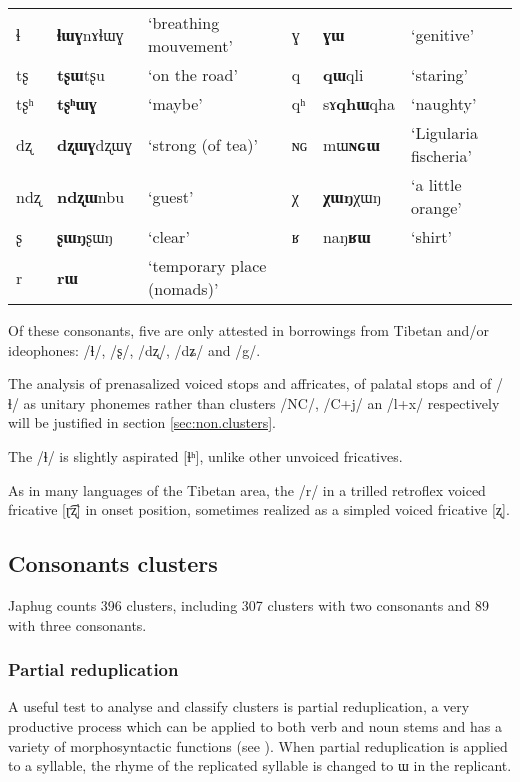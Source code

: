 \documentclass[oldfontcommands,oneside,a4paper,11pt]{article}
\newcommand{\ipa}[1]{{\phon #1}} %
\begin{document}
\begin{table}
{\begin{tabular}{lll|lll}
ɬ   & 	  \ipa{\textbf{ɬɯɣ}nɤɬɯɣ}   & 	 `breathing mouvement' & 	ɣ & 	\ipa{\textbf{ɣɯ}}   & 	 `genitive' \\ 
tʂ   & 	  \ipa{\textbf{tʂɯ}tʂu}   & 	 `on the road' & 	q & 	\ipa{\textbf{qɯ}qli}   & 	 `staring' \\ 
tʂʰ   & 	  \ipa{\textbf{tʂʰɯɣ}}   & 	 `maybe' & 	qʰ & 	\ipa{sɤ\textbf{qhɯ}qha}   & 	 `naughty' \\ 
dʐ   & 	\ipa{\textbf{dʐɯɣ}dʐɯɣ}   & 	 `strong (of tea)' & 	ɴɢ & 	\ipa{mɯ\textbf{ɴɢɯ}}  & 	 `Ligularia fischeria' \\ 
ndʐ & 	\ipa{\textbf{ndʐɯ}nbu}   & 	 `guest' & 	χ & 	\ipa{\textbf{χɯŋ}χɯŋ}   & 	 `a little orange' \\ 
ʂ & 	\ipa{\textbf{ʂɯŋ}ʂɯŋ}   & 	 `clear' & 	ʁ & 	\ipa{naŋ\textbf{ʁɯ}}   & 	 `shirt' \\ 
r & 	\ipa{\textbf{rɯ}}   & 	 `temporary place (nomads)' & 	  & 	 & 	 \\ 
\bottomrule
\end{tabular}}
\end{table}

Of these consonants, five are only attested in borrowings from Tibetan and/or ideophones: /ɬ/, /ʂ/, /dʐ/, /dʑ/ and /g/.

The analysis of prenasalized voiced stops and affricates, of palatal stops and of /ɬ/ as unitary phonemes rather than clusters /NC/, /C+j/ an /l+x/ respectively will be justified in section \ref{sec:non.clusters}. 

The /ɬ/ is slightly aspirated [ɬʰ], unlike other unvoiced fricatives.


As in many languages of the Tibetan area, the /r/ in a trilled retroflex voiced fricative [ɽ͡ʐ] in onset position, sometimes realized as a simpled voiced fricative [ʐ].


  \subsection{Consonants clusters} \label{sec:clusters}
  Japhug counts 396 clusters, including  307 clusters with two consonants and 89 with three consonants.
  
  \subsubsection{Partial reduplication}
 A useful test to analyse and classify clusters is partial reduplication, a very productive process which can be applied to both verb and noun stems and has a variety of morphosyntactic functions (see \citealt{jacques07redupl}). When partial reduplication is applied to a syllable, the rhyme of the replicated syllable is changed to \ipa{ɯ} in the replicant.
 
\end{document}
